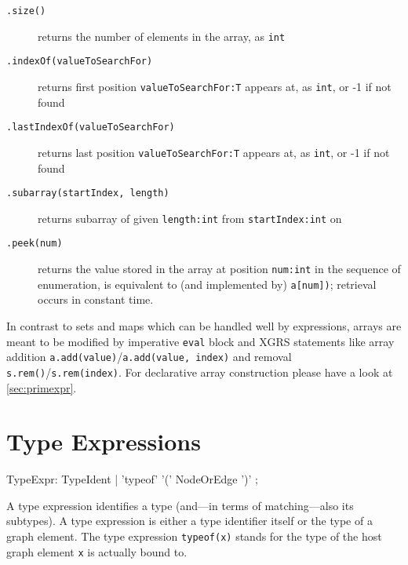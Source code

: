 \begin{description}
\item[\texttt{.size()}] returns the number of elements in the array, as \texttt{int}
\item[\texttt{.indexOf(valueToSearchFor)}] returns first position \texttt{valueToSearchFor:T} appears at, as \texttt{int}, or -1 if not found
\item[\texttt{.lastIndexOf(valueToSearchFor)}] returns last position \texttt{valueToSearchFor:T} appears at, as \texttt{int}, or -1 if not found
\item[\texttt{.subarray(startIndex, length)}] returns subarray of given \texttt{length:int} from \texttt{startIndex:int} on
\item[\texttt{.peek(num)}] returns the value stored in the array at position \texttt{num:int} in the sequence of enumeration, is equivalent to (and implemented by) \texttt{a[num])}; retrieval occurs in constant time.
\end{description}

\begin{note}
In contrast to sets and maps which can be handled well by expressions, arrays are meant to be modified by imperative \texttt{eval} block and XGRS statements like array addition \texttt{a.add(value)}/\texttt{a.add(value, index)} and removal \texttt{s.rem()}/\texttt{s.rem(index)}.
For declarative array construction please have a look at \ref{sec:primexpr}.
\end{note}


\section{Type Expressions}
\label{typeexpressions}

\begin{rail}
  TypeExpr: TypeIdent | 'typeof' '(' NodeOrEdge ')' ;
\end{rail}
A type expression identifies a type (and---in terms of matching---also its subtypes).
A type expression is either a type identifier itself or the type of a graph element.
The type expression \texttt{typeof(x)} stands for the type of the host graph element \texttt{x} is actually bound to.

